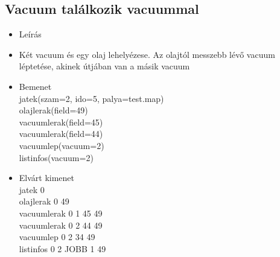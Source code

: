 \subsection{Vacuum találkozik vacuummal}
\begin{itemize}
	\item Leírás\\
	\item Két vacuum és egy olaj lehelyézese. Az olajtól messzebb lévő vacuum léptetése, akinek útjában van a másik vacuum
	\item Bemenet\\
		jatek(szam=2, ido=5, palya=test.map) \\
		olajlerak(field=49) \\
		vacuumlerak(field=45) \\
		vacuumlerak(field=44) \\
		vacuumlep(vacuum=2) \\
		listinfos(vacuum=2) \\
	\item Elvárt kimenet\\
		jatek 0 \\
		olajlerak 0 49 \\		
		vacuumlerak 0 1 45 49\\		
		vacuumlerak 0 2 44 49\\
		vacuumlep 0 2 34 49 \\
		listinfos 0 2 JOBB 1 49 \\
\end{itemize}

